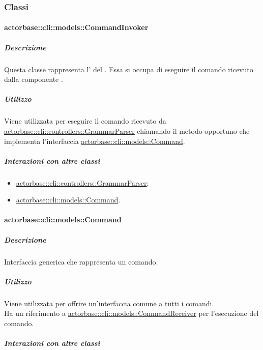 \documentclass{scalatekids-article}
\begin{document}
\subsubsection{Classi}

\paragraph{actorbase::cli::models::CommandInvoker}
\label{sec:actorbase::cli::models::CommandInvoker}

\subparagraph{Descrizione}

Questa classe rappresenta l' del . Essa
si occupa di eseguire il comando ricevuto dalla componente .

\subparagraph{Utilizzo}

Viene utilizzata per eseguire il comando ricevuto da
\hyperref[sec:actorbase::cli::controllers::GrammarParser]{actorbase::cli::controllers::GrammarParser} chiamando il metodo opportuno che
implementa l'interfaccia \hyperref[sec:actorbase::cli::models::Command]{actorbase::cli::models::Command}.

\subparagraph{Interazioni con altre classi}

\begin{itemize}
\item \hyperref[sec:actorbase::cli::controllers::GrammarParser]{actorbase::cli::controllers::GrammarParser};
\item \hyperref[sec:actorbase::cli::models::Command]{actorbase::cli::models::Command}.
\end{itemize}

\paragraph{actorbase::cli::models::Command}
\label{sec:actorbase::cli::models::Command}

\subparagraph{Descrizione}

Interfaccia generica che rappresenta un comando.

\subparagraph{Utilizzo}

Viene utilizzata per offrire un'interfaccia comune a tutti i comandi.\\Ha un
riferimento a \hyperref[sec:actorbase::cli::models::CommandReceiver]{actorbase::cli::models::CommandReceiver} per l'esecuzione del
comando.

\subparagraph{Interazioni con altre classi}
\end{document}
